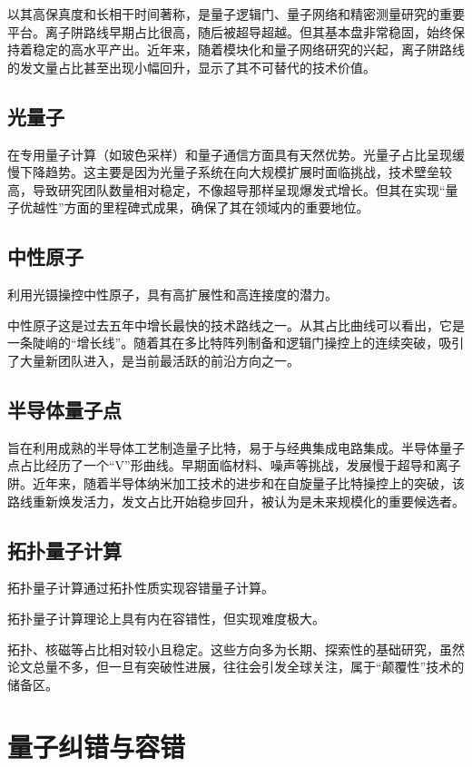 \documentclass[12pt,a4paper]{article}
\begin{document}
    以其高保真度和长相干时间著称，是量子逻辑门、量子网络和精密测量研究的重要平台。离子阱路线早期占比很高，随后被超导超越。但其基本盘非常稳固，始终保持着稳定的高水平产出。近年来，随着模块化和量子网络研究的兴起，离子阱路线的发文量占比甚至出现小幅回升，显示了其不可替代的技术价值。

    \subsection{光量子}
    在专用量子计算（如玻色采样）和量子通信方面具有天然优势。光量子占比呈现缓慢下降趋势。这主要是因为光量子系统在向大规模扩展时面临挑战，技术壁垒较高，导致研究团队数量相对稳定，不像超导那样呈现爆发式增长。但其在实现“量子优越性”方面的里程碑式成果，确保了其在领域内的重要地位。

    \subsection{中性原子}
    利用光镊操控中性原子，具有高扩展性和高连接度的潜力。

    中性原子这是过去五年中增长最快的技术路线之一。从其占比曲线可以看出，它是一条陡峭的“增长线”。随着其在多比特阵列制备和逻辑门操控上的连续突破，吸引了大量新团队进入，是当前最活跃的前沿方向之一。

    \subsection{半导体量子点}
    旨在利用成熟的半导体工艺制造量子比特，易于与经典集成电路集成。半导体量子点占比经历了一个“V”形曲线。早期面临材料、噪声等挑战，发展慢于超导和离子阱。近年来，随着半导体纳米加工技术的进步和在自旋量子比特操控上的突破，该路线重新焕发活力，发文占比开始稳步回升，被认为是未来规模化的重要候选者。



    \subsection{拓扑量子计算}
    拓扑量子计算通过拓扑性质实现容错量子计算。

    拓扑量子计算理论上具有内在容错性，但实现难度极大。

    拓扑、核磁等占比相对较小且稳定。这些方向多为长期、探索性的基础研究，虽然论文总量不多，但一旦有突破性进展，往往会引发全球关注，属于“颠覆性”技术的储备区。

\section{量子纠错与容错}
\end{document}

